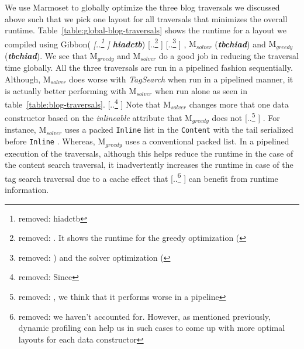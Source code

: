 \documentclass[acmsmall,review,anonymous]{acmart}\settopmatter{printfolios=true,printccs=false,printacmref=false}
\newcommand{\system}{{\sc Marmoset}\xspace}
\newcommand{\systemSolver}{{\sc M$_{\mathit{solver}}$}\xspace} %
\newcommand{\systemGreedy}{{\sc M$_{\mathit{greedy}}$}\xspace} %
\newcommand{\gibbon}{{\sc Gibbon}\xspace}
\providecommand{\DIFaddtex}[1]{{\protect\color{blue} \sf #1}} %
\providecommand{\DIFdeltex}[1]{{\protect\color{red} [..\footnote{removed: #1} ]}} %
\providecommand{\DIFaddbegin}{} %
\providecommand{\DIFaddend}{} %
\providecommand{\DIFdelbegin}{} %
\providecommand{\DIFdelend}{} %
\providecommand{\DIFadd}[1]{\texorpdfstring{\DIFaddtex{#1}}{#1}} %
\providecommand{\DIFdel}[1]{\texorpdfstring{\DIFdeltex{#1}}{}} %
\newcommand{\DIFscaledelfig}{0.5}
\newlength{\DIFdelgraphicswidth} %
\newlength{\DIFdelgraphicsheight} %
\newcommand{\DIFaddincludegraphics}[2][]{{\color{blue}\fbox{\DIFOincludegraphics[#1]{#2}}}} %
\newcommand{\DIFdelincludegraphics}[2][]{%
\sbox{\DIFdelgraphicsbox}{\DIFOincludegraphics[#1]{#2}}%
\settoboxwidth{\DIFdelgraphicswidth}{\DIFdelgraphicsbox} %
\settoboxtotalheight{\DIFdelgraphicsheight}{\DIFdelgraphicsbox} %
\scalebox{\DIFscaledelfig}{%
\parbox[b]{\DIFdelgraphicswidth}{\usebox{\DIFdelgraphicsbox}\\[-\baselineskip] \rule{\DIFdelgraphicswidth}{0em}}\llap{\resizebox{\DIFdelgraphicswidth}{\DIFdelgraphicsheight}{%
\setlength{\unitlength}{\DIFdelgraphicswidth}%
\begin{picture}(1,1)%
\thicklines\linethickness{2pt} %
{\color[rgb]{1,0,0}\put(0,0){\framebox(1,1){}}}%
{\color[rgb]{1,0,0}\put(0,0){\line( 1,1){1}}}%
{\color[rgb]{1,0,0}\put(0,1){\line(1,-1){1}}}%
\end{picture}%
}\hspace*{3pt}}} %
} %
\DeclareRobustCommand{\DIFaddbegin}{\DIFOaddbegin \let\includegraphics\DIFaddincludegraphics} %
\DeclareRobustCommand{\DIFaddend}{\DIFOaddend \let\includegraphics\DIFOincludegraphics} %
\DeclareRobustCommand{\DIFdelbegin}{\DIFOdelbegin \let\includegraphics\DIFdelincludegraphics} %
\DeclareRobustCommand{\DIFdelend}{\DIFOaddend \let\includegraphics\DIFOincludegraphics} %
\begin{document}
We use \system to globally optimize the three blog traversals we discussed above such that we pick one layout for all traversals that minimizes the overall runtime.
\DIFaddbegin {}
\DIFaddend Table~\ref{table:global-blog-traversals} shows the runtime for a layout we compiled using \gibbon (\textit{\DIFdelbegin \DIFdel{hiadctb}\DIFdelend \DIFaddbegin \DIFadd{\textbf{hiadctb}}\DIFaddend })\DIFdelbegin \DIFdel{. It shows the runtime for the greedy optimization (}%
\DIFdel{) 
and the solver optimization (}%
\DIFdelend \DIFaddbegin \DIFadd{, }\systemSolver\DIFadd{(\textit{\textbf{tbchiad}}) 
and }\systemGreedy\DIFadd{(\textit{\textbf{tbchiad}}}\DIFaddend ). We see that \systemGreedy and \systemSolver do a good job in reducing the traversal time globally. 
All the three traversals are run in a pipelined fashion sequentially. Although, \systemSolver does worse with \textit{TagSearch} when run in a pipelined manner, 
it is actually better performing with \systemSolver when run alone as seen in table~\ref{table:blog-traversals}. 
\DIFdelbegin \DIFdel{Since }\DIFdelend \DIFaddbegin \DIFadd{Note that }\DIFaddend \systemSolver changes more that one data constructor based on the \textit{inlineable} attribute that \systemGreedy does not\DIFdelbegin \DIFdel{, we think that it performs worse in a pipeline }\DIFdelend \DIFaddbegin \DIFadd{.
For instance, }\systemSolver \DIFadd{uses a packed }{\color{blue}%
\lstinline|Inline| %
}%
\DIFadd{list in the }{\color{blue}%
\lstinline|Content| %
}%
\DIFadd{with the tail serialized before }{\color{blue}%
\lstinline|Inline|%
}%
\DIFadd{.
Whereas, }\systemGreedy \DIFadd{uses a conventional packed list. In a pipelined execution of the traversals, although this helps reduce the runtime in the case 
of the content search traversal, it inadvertently increases the runtime in case of the tag search traversal }\DIFaddend due to a cache effect
that \DIFdelbegin \DIFdel{we haven't accounted for. However, as mentioned previously, dynamic profiling can help us in such cases to come up with more optimal layouts for each data constructor}\DIFdelend \DIFaddbegin \DIFadd{can benefit from runtime information}\DIFaddend .
\end{document}
